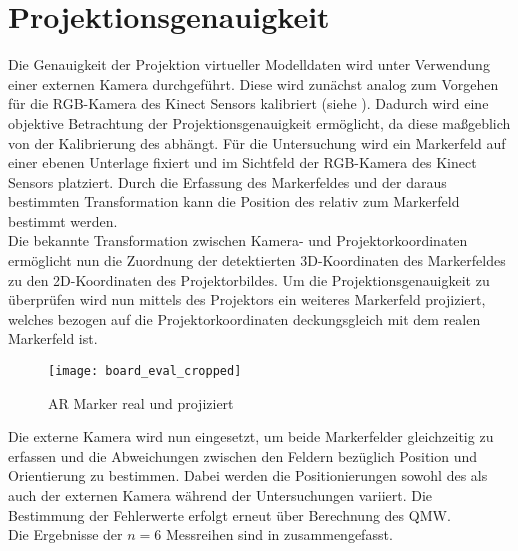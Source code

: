\section{Projektionsgenauigkeit}
Die Genauigkeit der Projektion virtueller Modelldaten wird unter Verwendung einer externen Kamera durchgeführt. Diese wird zunächst analog zum Vorgehen für die RGB-Kamera des Kinect Sensors kalibriert (siehe ). Dadurch wird eine objektive Betrachtung der Projektionsgenauigkeit ermöglicht, da diese maßgeblich von der Kalibrierung des  abhängt. Für die Untersuchung wird ein Markerfeld auf einer ebenen Unterlage fixiert und im Sichtfeld der RGB-Kamera des Kinect Sensors platziert. Durch die Erfassung des Markerfeldes und der daraus bestimmten Transformation kann die Position des  relativ zum Markerfeld bestimmt werden.\\

Die bekannte Transformation zwischen Kamera- und Projektorkoordinaten ermöglicht nun die Zuordnung der detektierten 3D-Koordinaten des Markerfeldes zu den 2D-Koordinaten des Projektorbildes. Um die Projektionsgenauigkeit zu überprüfen wird nun mittels des Projektors ein weiteres Markerfeld projiziert, welches bezogen auf die Projektorkoordinaten deckungsgleich mit dem realen Markerfeld ist. \\

\begin{figure}[!ht]
	\begin{center}
		\texttt{[image: board\_eval\_cropped]}
		\caption{AR Marker real und projiziert}
		\label{fig.arprojected}
	\end{center}
\end{figure}

Die externe Kamera wird nun eingesetzt, um beide Markerfelder gleichzeitig zu erfassen und die Abweichungen zwischen den Feldern bezüglich Position und Orientierung zu bestimmen. Dabei werden die Positionierungen sowohl des  als auch der externen Kamera während der Untersuchungen variiert. Die Bestimmung der Fehlerwerte erfolgt erneut über Berechnung des QMW.\\
Die Ergebnisse der $n=6$ Messreihen sind in  zusammengefasst.\\

